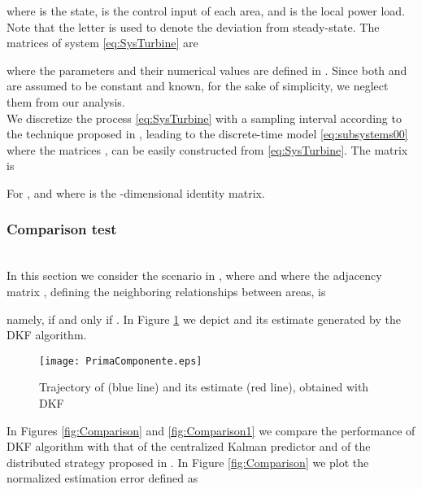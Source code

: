 \documentclass[journal,10pt,draftcls,onecolumn]{IEEEtran}
\begin{document}
where  is the state,  is the control input of each area, and  is the local power load. Note that the letter  is used to denote the deviation from steady-state. The matrices of system \eqref{eq:SysTurbine} are


where the parameters and their numerical values are defined in \cite{SR-GFT:12}.
Since both  and  are assumed to be constant and known, for the sake of simplicity, we neglect them from our analysis.\\
We discretize the process \eqref{eq:SysTurbine} with a sampling interval  according to the technique proposed in \cite{FarinaAut2013}, leading to the discrete-time model \eqref{eq:subsystems00} where the matrices ,  can be easily constructed from \eqref{eq:SysTurbine}. The matrix  is

For ,  and  where  is the -dimensional identity matrix.

\subsubsection{Comparison test}\label{ex:comparison}\hfill\\
In this section we consider the scenario  in \cite{SR-GFT:12}, where  and where the adjacency matrix , defining the neighboring relationships between areas, is

namely,  if and only if . In Figure \ref{fig:PrimaComponente} we depict  and its estimate  generated by the DKF algorithm.\\
\begin{figure}
\centering
\texttt{[image: PrimaComponente.eps]}
\caption{Trajectory of  (blue line) and its estimate (red line), obtained with DKF}
\label{fig:PrimaComponente}
\end{figure}
In Figures \ref{fig:Comparison} and \ref{fig:Comparison1} we compare the performance of DKF algorithm with that of the centralized Kalman predictor and of the distributed strategy proposed in \cite{Negenborn-Kalman13}. In Figure \ref{fig:Comparison} we plot the normalized estimation error  defined as
\end{document}
